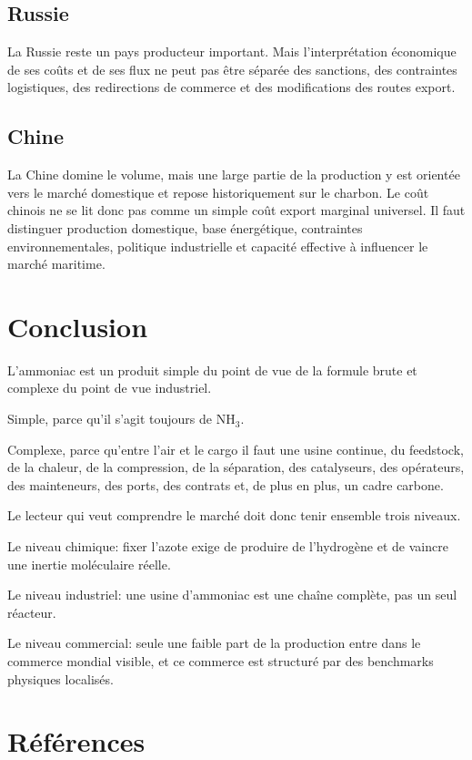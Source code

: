\documentclass[11pt]{article}
\begin{document}
\subsection{Russie}

La Russie reste un pays producteur important. Mais l'interprétation économique de ses coûts et de ses flux ne peut pas être séparée des sanctions, des contraintes logistiques, des redirections de commerce et des modifications des routes export.

\subsection{Chine}

La Chine domine le volume, mais une large partie de la production y est orientée vers le marché domestique et repose historiquement sur le charbon. Le coût chinois ne se lit donc pas comme un simple coût export marginal universel. Il faut distinguer production domestique, base énergétique, contraintes environnementales, politique industrielle et capacité effective à influencer le marché maritime.


\section{Conclusion}

L'ammoniac est un produit simple du point de vue de la formule brute et complexe du point de vue industriel.

Simple, parce qu'il s'agit toujours de \(\mathrm{NH_3}\).

Complexe, parce qu'entre l'air et le cargo il faut une usine continue, du feedstock, de la chaleur, de la compression, de la séparation, des catalyseurs, des opérateurs, des mainteneurs, des ports, des contrats et, de plus en plus, un cadre carbone.

Le lecteur qui veut comprendre le marché doit donc tenir ensemble trois niveaux.

Le niveau chimique: fixer l'azote exige de produire de l'hydrogène et de vaincre une inertie moléculaire réelle.

Le niveau industriel: une usine d'ammoniac est une chaîne complète, pas un seul réacteur.

Le niveau commercial: seule une faible part de la production entre dans le commerce mondial visible, et ce commerce est structuré par des benchmarks physiques localisés.

\section*{Références}
\end{document}
